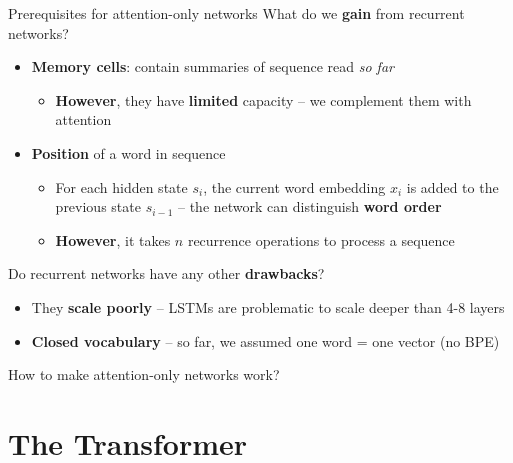 \documentclass[12pt,aspectratio=169,handout]{beamer}
\begin{document}
\begin{frame}{Prerequisites for attention-only networks}
	What do we \textbf{gain} from recurrent networks?
	\pause

	\begin{itemize}
		\item \textbf{Memory cells}: contain summaries of sequence read \textit{so far}
		\pause
		\begin{itemize}
			\item \textbf{However}, they have \textbf{limited} capacity -- we complement them with attention
		\end{itemize}
		\pause
		\item \textbf{Position} of a word in sequence
		\pause
		\begin{itemize}
			\item For each hidden state $s_{i}$, the current word embedding $x_i$ is added to the previous state $s_{i-1}$ -- the network can distinguish \textbf{word order}
			\pause
			\item \textbf{However}, it takes $n$ recurrence operations to process a sequence 
		\end{itemize}

	\end{itemize}
	\pause

	Do recurrent networks have any other \textbf{drawbacks}?

	\pause

	\begin{itemize}
		\item They \textbf{scale poorly} -- LSTMs are problematic to scale deeper than 4-8 layers
		\item \textbf{Closed vocabulary} -- so far, we assumed one word = one vector (no BPE)
	\end{itemize}
	\pause

	How to make attention-only networks work?

\end{frame}

\section{The Transformer}
\end{document}
